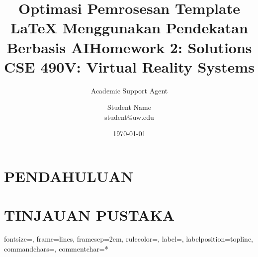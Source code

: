 \documentclass{styles/acmsiggraph}
\title{Optimasi Pemrosesan Template LaTeX Menggunakan Pendekatan Berbasis AI}
\author{Academic Support Agent}
\date{\today}
\begin{document}
\maketitle

\begin{abstract}

\end{abstract}

\chapter{PENDAHULUAN}


\chapter{TINJAUAN PUSTAKA}



\usepackage{comment} %
\usepackage{lipsum} %
\usepackage{fullpage} %
\usepackage{enumitem} %
\usepackage{amsmath,amsthm,amssymb}
\usepackage{listings}
\usepackage{graphicx}
\usepackage{etoolbox}   %
\usepackage{verbatim}   %
\usepackage[dvipsnames]{xcolor}
\usepackage{fancyvrb}
\usepackage{hyperref}
\usepackage{menukeys}
\usepackage{titlesec}
\setlength{\parskip}{.8mm}

\title{\huge Homework 2: Solutions \\ \LARGE {CSE 490V: Virtual Reality Systems}}
\author{\Large Student Name \\ student@uw.edu}


\hypersetup{
	colorlinks=true,
	linkcolor=magenta,
	filecolor=magenta,
	urlcolor=blue,
}

{}%
{fontsize=\footnotesize,
 frame=lines,  %
 framesep=2em, %
 rulecolor=\color{Gray},
 label=,
 labelposition=topline,
 commandchars=\|\(\), %
 commentchar=*        %
}

\newcommand{\norm}[1]{\left\lVert#1\right\rVert}
\renewcommand{\vec}[1]{\mathbf{#1}}
\end{document}
